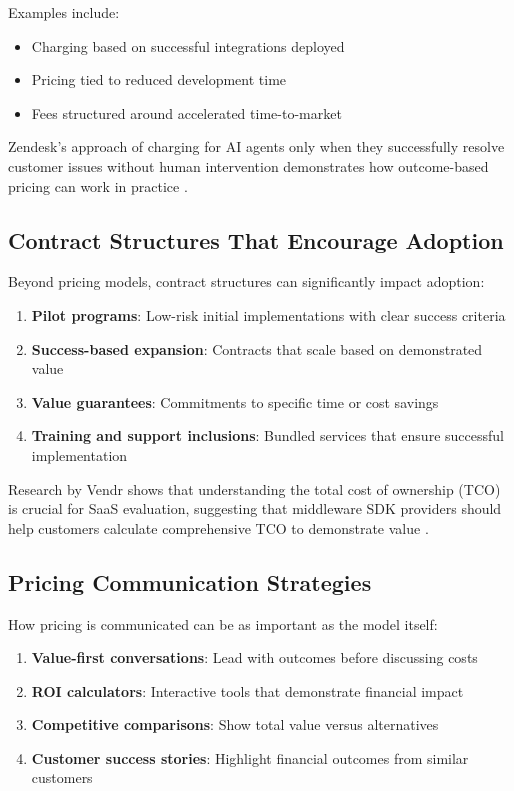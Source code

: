 \documentclass[11pt,a4paper]{article}
\begin{document}
Examples include:
\begin{itemize}
    \item Charging based on successful integrations deployed
    \item Pricing tied to reduced development time
    \item Fees structured around accelerated time-to-market
\end{itemize}

Zendesk's approach of charging for AI agents only when they successfully resolve customer issues without human intervention demonstrates how outcome-based pricing can work in practice \cite{orb2023}.

\subsection{Contract Structures That Encourage Adoption}

Beyond pricing models, contract structures can significantly impact adoption:

\begin{enumerate}
    \item \textbf{Pilot programs}: Low-risk initial implementations with clear success criteria
    \item \textbf{Success-based expansion}: Contracts that scale based on demonstrated value
    \item \textbf{Value guarantees}: Commitments to specific time or cost savings
    \item \textbf{Training and support inclusions}: Bundled services that ensure successful implementation
\end{enumerate}

Research by Vendr shows that understanding the total cost of ownership (TCO) is crucial for SaaS evaluation, suggesting that middleware SDK providers should help customers calculate comprehensive TCO to demonstrate value \cite{vendr2023}.

\subsection{Pricing Communication Strategies}

How pricing is communicated can be as important as the model itself:

\begin{enumerate}
    \item \textbf{Value-first conversations}: Lead with outcomes before discussing costs
    \item \textbf{ROI calculators}: Interactive tools that demonstrate financial impact
    \item \textbf{Competitive comparisons}: Show total value versus alternatives
    \item \textbf{Customer success stories}: Highlight financial outcomes from similar customers
\end{enumerate}
\end{document}
